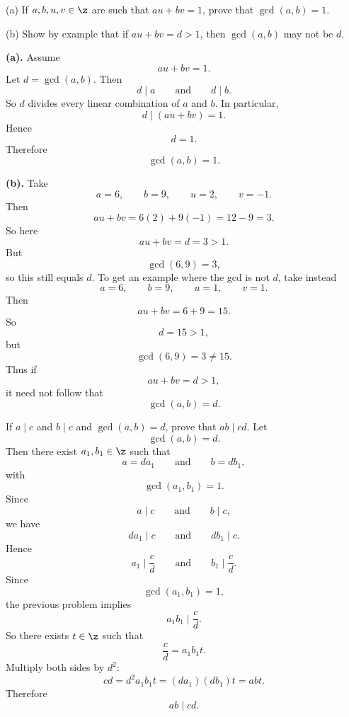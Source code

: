 \begin{problem}{
    (a) If $a,b,u,v\in\z$ are such that $au+bv=1$, prove that $\gcd(a,b)=1$.

    (b) Show by example that if $au+bv=d>1$, then $\gcd(a,b)$ may not be $d$.
}
    \textbf{(a).}
    Assume
    \[
        au+bv=1.
    \]
    Let $d=\gcd(a,b)$.
    Then
    \[
        d\mid a
        \qquad\text{and}\qquad
        d\mid b.
    \]
    So $d$ divides every linear combination of $a$ and $b$.
    In particular,
    \[
        d\mid (au+bv)=1.
    \]
    Hence
    \[
        d=1.
    \]
    Therefore
    \[
        \gcd(a,b)=1.
    \]

    \textbf{(b).}
    Take
    \[
        a=6,
        \qquad
        b=9,
        \qquad
        u=2,
        \qquad
        v=-1.
    \]
    Then
    \[
        au+bv=6(2)+9(-1)=12-9=3.
    \]
    So here
    \[
        au+bv=d=3>1.
    \]
    But
    \[
        \gcd(6,9)=3,
    \]
    so this still equals $d$.
    To get an example where the gcd is not $d$, take instead
    \[
        a=6,
        \qquad
        b=9,
        \qquad
        u=1,
        \qquad
        v=1.
    \]
    Then
    \[
        au+bv=6+9=15.
    \]
    So
    \[
        d=15>1,
    \]
    but
    \[
        \gcd(6,9)=3\neq 15.
    \]
    Thus if
    \[
        au+bv=d>1,
    \]
    it need not follow that
    \[
        \gcd(a,b)=d.
    \]
\end{problem}

\begin{problem}{
    If $a\mid c$ and $b\mid c$ and $\gcd(a,b)=d$, prove that $ab\mid cd$.
}
    Let
    \[
        \gcd(a,b)=d.
    \]
    Then there exist $a_1,b_1\in\z$ such that
    \[
        a=da_1
        \qquad\text{and}\qquad
        b=db_1,
    \]
    with
    \[
        \gcd(a_1,b_1)=1.
    \]
    Since
    \[
        a\mid c
        \qquad\text{and}\qquad
        b\mid c,
    \]
    we have
    \[
        da_1\mid c
        \qquad\text{and}\qquad
        db_1\mid c.
    \]
    Hence
    \[
        a_1\mid \frac{c}{d}
        \qquad\text{and}\qquad
        b_1\mid \frac{c}{d}.
    \]
    Since
    \[
        \gcd(a_1,b_1)=1,
    \]
    the previous problem implies
    \[
        a_{1}b_1\mid \frac{c}{d}.
    \]
    So there exists $t\in\z$ such that
    \[
        \frac{c}{d}=a_{1}b_{1}t.
    \]
    Multiply both sides by $d^2$:
    \[
        cd=d^{2}a_{1}b_{1}t=(da_1)(db_1)t=abt.
    \]
    Therefore
    \[
        ab\mid cd.
    \]
\end{problem}

